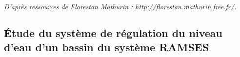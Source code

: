 \documentclass[10pt]{article}
\begin{document}










\setcounter{subparagraph}{0}

\begin{flushright}
\textit{D'après ressources de Florestan Mathurin : \url{http://florestan.mathurin.free.fr/}.}
\end{flushright}

\subsection*{Étude du système de régulation du niveau d'eau d'un bassin du système RAMSES}
\end{document}
